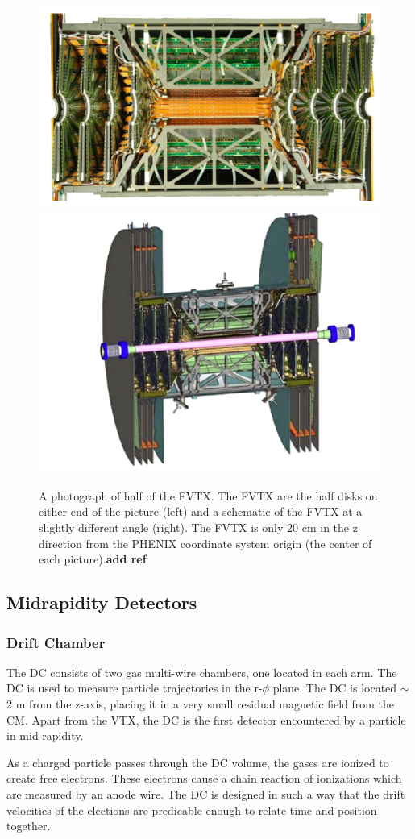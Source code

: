\begin{figure}[h!]
\begin{center}
\includegraphics[width=0.45\linewidth]{figs/fvtx_cutaway.png}
\includegraphics[width=0.45\linewidth]{figs/fvtx_diagram.png}
\caption{A photograph of half of the FVTX. The FVTX are the half disks on either end of the picture (left) and a schematic of the FVTX at a slightly different angle (right). The FVTX is only 20 cm in the z direction from the PHENIX coordinate system origin (the center of each picture).\textbf{add ref}}
\label{fig:fvtx_cutaway}
\end{center}
\end{figure}
\subsection{Midrapidity Detectors}
\subsubsection{Drift Chamber}
The DC consists of two gas multi-wire chambers, one located in each arm. The DC is used to measure particle trajectories in the r-$\phi$ plane.
The DC is located $\sim$2 m from the z-axis, placing it in a very small residual magnetic field from the CM. Apart from the VTX, the DC is the first detector encountered by a particle in mid-rapidity. 

As a charged particle passes through the DC volume, the gases are ionized to create free electrons. These electrons cause a chain reaction of ionizations which are measured by an anode wire. The DC is designed in such a way that the drift velocities of the elections are predicable enough to relate time and position together. 


